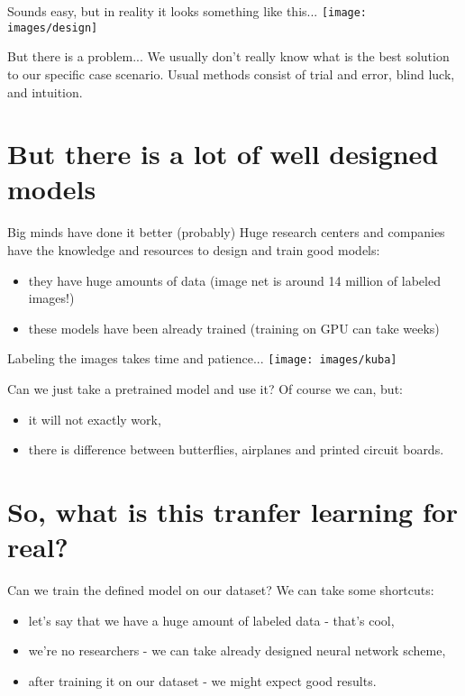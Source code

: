 \documentclass[aspectratio=1610,english]{beamer} %
\begin{document}
 	\begin{frame}{Sounds easy, but in reality it looks something like this...}
 	\centering
	 \texttt{[image: images/design]}
	\end{frame}
 
	\begin{frame}{But there is a problem...}
		We usually don't really know what is the best solution to our specific case scenario.
		\newline
		\newline
		Usual methods consist of trial and error, blind luck, and intuition.
	
	 \end{frame}
 
 	\section{But there is a lot of well designed models}
	\begin{frame}{Big minds have done it better (probably)}
	Huge research centers and companies have the knowledge and resources to design and train good models:
		 \begin{itemize}
		 	\item they have huge amounts of data (image net is around 14 million of labeled images!)
		 	\item these models have been already trained (training on GPU can take weeks)
		 \end{itemize}
	\end{frame}

	\begin{frame}{Labeling the images takes time and patience...}
		\texttt{[image: images/kuba]}
	\end{frame}

 	\begin{frame}{Can we just take a pretrained model and use it?}
 		Of course we can, but:
		 \begin{itemize}
		 	\item it will not exactly work,
		 	\item there is difference between butterflies, airplanes and printed circuit boards.
		 \end{itemize}
	\end{frame}

\section{So, what is this tranfer learning for real?}
 	\begin{frame}{Can we train the defined model on our dataset?}
 	We can take some shortcuts:
		\begin{itemize}
			\item let's say that we have a huge amount of labeled data - that's cool,
			\item we're no researchers - we can take already designed neural network scheme,
			\item after training it on our dataset - we might expect good results.
		\end{itemize}
	\end{frame}
 
\end{document}
